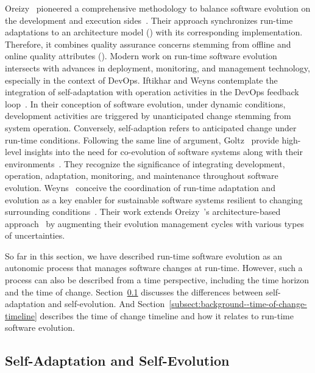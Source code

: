 Oreizy~\etal{} pioneered a comprehensive methodology to balance software evolution on the development and execution sides~\cite{oreizy-1999-architecture}. Their approach synchronizes run-time adaptations to an architecture model () with its corresponding implementation. Therefore, it combines quality assurance concerns stemming from offline and online quality attributes (). Modern work on run-time software evolution intersects with advances in deployment, monitoring, and management technology, especially in the context of DevOps. Iftikhar and Weyns contemplate the integration of self-adaptation with operation activities in the DevOps feedback loop~\cite{iftikhar-2017-activforms}. In their conception of software evolution, under dynamic conditions, development activities are triggered by unanticipated change stemming from system operation. Conversely, self-adaption refers to anticipated change under run-time conditions. Following the same line of argument, Goltz~\etal{} provide high-level insights into the need for co-evolution of software systems along with their environments~\cite{goltz-2015-design}. They recognize the significance of integrating development, operation, adaptation, monitoring, and maintenance throughout software evolution. Weyns~\etal{} conceive the coordination of run-time adaptation and evolution as a key enabler for sustainable software systems resilient to changing surrounding conditions~\cite{weyns-2015-design}. Their work extends Oreizy~\etal{}'s architecture-based approach~\cite{oreizy-1999-architecture} by augmenting their evolution management cycles with various types of uncertainties.

So far in this section, we have described run-time software evolution as an autonomic process that manages software changes at run-time. However, such a process can also be described from a time perspective, including the time horizon and the time of change. Section~\ref{subsect:background--self-adaptation-and-self-evolution} discusses the differences between self-adaptation and self-evolution. And Section~\ref{subsect:background--time-of-change-timeline} describes the time of change timeline and how it relates to run-time software evolution.

\subsection{Self-Adaptation and Self-Evolution}
\label{subsect:background--self-adaptation-and-self-evolution}

